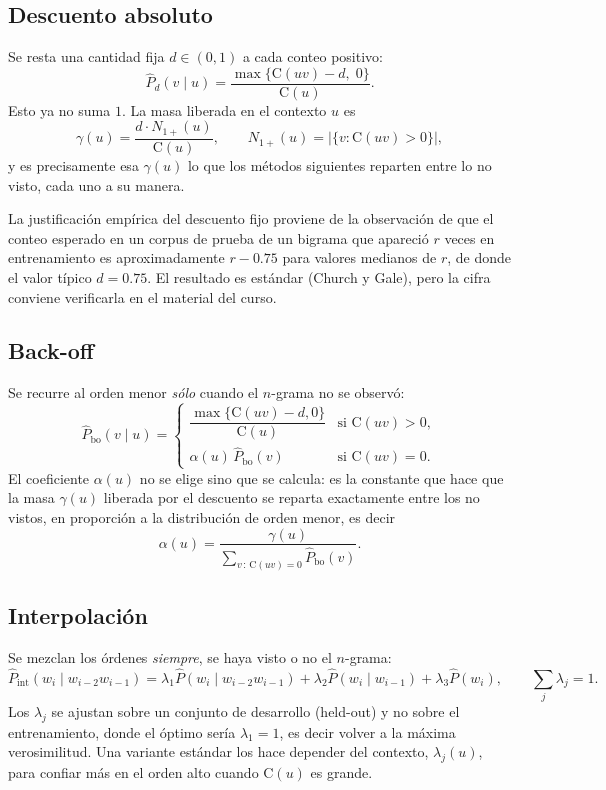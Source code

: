 \documentclass[11pt,letterpaper]{article}
\newcommand{\Count}{\mathrm{C}}
\begin{document}
\subsection{Descuento absoluto}

Se resta una cantidad fija $d\in(0,1)$ a cada conteo positivo:
\[
\hat{P}_d(v\mid u) = \frac{\max\{\Count(uv)-d,\;0\}}{\Count(u)} .
\]
Esto ya no suma $1$. La masa liberada en el contexto $u$ es
\[
\gamma(u) = \frac{d\cdot N_{1+}(u)}{\Count(u)},
\qquad
N_{1+}(u) = |\{v : \Count(uv)>0\}| ,
\]
y es precisamente esa $\gamma(u)$ lo que los métodos siguientes reparten entre
lo no visto, cada uno a su manera.

\begin{observacion}
La justificación empírica del descuento fijo proviene de la observación de que
el conteo esperado en un corpus de prueba de un bigrama que apareció $r$ veces
en entrenamiento es aproximadamente $r-0.75$ para valores medianos de $r$, de
donde el valor típico $d=0.75$. El resultado es estándar (Church y Gale), pero
la cifra conviene verificarla en el material del curso.
\end{observacion}

\subsection{Back-off}

Se recurre al orden menor \emph{sólo} cuando el $n$-grama no se observó:
\[
\hat{P}_{\text{bo}}(v\mid u) =
\begin{cases}
\dfrac{\max\{\Count(uv)-d,0\}}{\Count(u)} & \text{si } \Count(uv)>0,\\[10pt]
\alpha(u)\,\hat{P}_{\text{bo}}(v) & \text{si } \Count(uv)=0 .
\end{cases}
\]
El coeficiente $\alpha(u)$ no se elige sino que se calcula: es la constante que
hace que la masa $\gamma(u)$ liberada por el descuento se reparta exactamente
entre los no vistos, en proporción a la distribución de orden menor, es decir
\[
\alpha(u) = \frac{\gamma(u)}{\sum_{v\,:\,\Count(uv)=0} \hat P_{\text{bo}}(v)} .
\]

\subsection{Interpolación}

Se mezclan los órdenes \emph{siempre}, se haya visto o no el $n$-grama:
\[
\hat{P}_{\text{int}}(w_i \mid w_{i-2}w_{i-1}) = \lambda_1 \hat P(w_i\mid
w_{i-2}w_{i-1}) + \lambda_2 \hat P(w_i\mid w_{i-1}) + \lambda_3 \hat P(w_i),
\qquad \sum_j \lambda_j = 1 .
\]
Los $\lambda_j$ se ajustan sobre un conjunto de desarrollo (held-out) y no sobre
el entrenamiento, donde el óptimo sería $\lambda_1=1$, es decir volver a la
máxima verosimilitud. Una variante estándar los hace depender del contexto,
$\lambda_j(u)$, para confiar más en el orden alto cuando $\Count(u)$ es grande.
\end{document}

